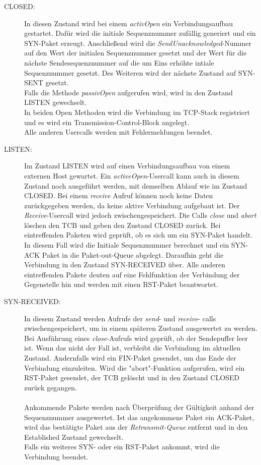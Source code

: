 \begin{description}
\item[CLOSED:]
In diesen Zustand wird bei einem \textit{activOpen} ein Verbindungsaufbau gestartet. Dafür wird die initiale Sequenznummer zufällig generiert und ein SYN-Paket erzeugt. Anschließend wird die \textit{SendUnacknowledged}-Nummer auf den Wert der initialen Sequenznummer gesetzt und der Wert für die nächste Sendesequenznummer auf die um Eins erhöhte intiale Sequenznummer gesetzt. Des Weiteren wird der nächste Zustand auf SYN-SENT gesetzt. \\
Falls die Methode \textit{passivOpen} aufgerufen wird, wird in den Zustand LISTEN gewechselt. \\
In beiden Open Methoden wird die Verbindung im TCP-Stack registriert und es wird ein Transmission-Control-Block angelegt.\\
Alle anderen Usercalls werden mit Fehlermeldungen beendet. 

\item[LISTEN:]
Im Zustand LISTEN wird auf einen Verbindungsaufbau von einem externen Host gewartet. Ein \textit{activeOpen}-Usercall kann auch in diesem Zustand noch ausgeführt werden, mit demselben Ablauf wie im Zustand CLOSED. Bei einem \textit{receive} Aufruf können noch keine Daten zurückgegeben werden, da keine aktive Verbindung aufgebaut ist. Der \textit{Receive}-Usercall wird jedoch zwischengespeichert. 
Die Calls \textit{close} und \textit{abort} löschen den TCB und geben den Zustand CLOSED zurück.
Bei eintreffenden Paketen wird geprüft, ob es sich um ein SYN-Paket handelt. In diesem Fall wird die Initiale Sequenznummer berechnet und ein SYN-ACK Paket in die Paket-out-Queue abgelegt. Daraufhin geht die Verbindung in den Zustand SYN-RECEIVED über. Alle anderen eintreffenden Pakete deuten auf eine Fehlfunktion der Verbindung der Gegenstelle hin und werden mit einen RST-Paket beantwortet. 


\item[SYN-RECEIVED:]
In diesem Zustand werden Aufrufe der \textit{send}- und \textit{receive}- calls zwischengespeichert, um in einem späteren Zustand ausgewertet zu werden. 
Bei Ausführung eines \textit{close}-Aufrufs wird geprüft, ob der Sendepuffer leer ist. Wenn das nicht der Fall ist, verbleibt die Verbindung im aktuellen Zustand. Andernfalls wird ein FIN-Paket gesendet, um das Ende der Verbindung einzuleiten. 
Wird die "{}abort"{}-Funktion aufgerufen, wird ein RST-Paket gesendet, der TCB gelöscht und in den Zustand CLOSED zurück gegangen.\\\\
Ankommende Pakete werden nach Überprüfung der Gültigkeit anhand der Sequenznummer ausgewertet. Ist das angekommene Paket ein ACK-Paket, wird das bestätigte Paket aus der \textit{Retransmit-Queue} entfernt und in den Established Zustand gewechselt. \\ Falls ein weiteres SYN- oder ein RST-Paket ankommt, wird die Verbindung beendet. 


\end{description}
